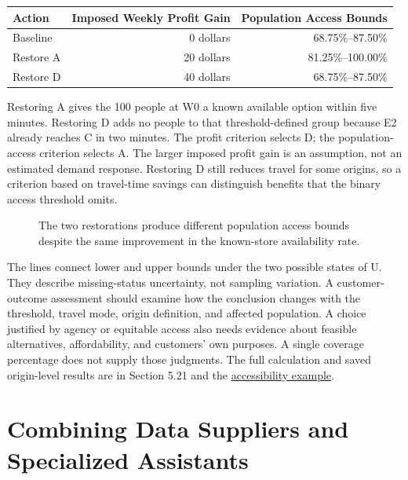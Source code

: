 \begin{table}[H]
\centering\small
\begin{tabular}{@{}lrr@{}}
\toprule
Action & Imposed Weekly Profit Gain & Population Access Bounds \\
\midrule

Baseline & 0 dollars & 68.75\%--87.50\% \\
Restore A & 20 dollars & 81.25\%--100.00\% \\
Restore D & 40 dollars & 68.75\%--87.50\% \\
\bottomrule
\end{tabular}
\end{table}

Restoring A gives the 100 people at W0 a known available option within
five minutes. Restoring D adds no people to that threshold-defined group
because E2 already reaches C in two minutes. The profit criterion
selects D; the population-access criterion selects A. The larger imposed
profit gain is an assumption, not an estimated demand response.
Restoring D still reduces travel for some origins, so a criterion based
on travel-time savings can distinguish benefits that the binary access
threshold omits.

\begin{figure}[htbp]
\centering

\caption{The two restorations produce different population access bounds despite the same improvement in the known-store availability rate.}\label{fig:M08_access_priorities}
\end{figure}

The lines connect lower and upper bounds under the two possible states
of U. They describe missing-status uncertainty, not sampling variation.
A customer-outcome assessment should examine how the conclusion changes
with the threshold, travel mode, origin definition, and affected
population. A choice justified by agency or equitable access also needs
evidence about feasible alternatives, affordability, and customers' own
purposes. A single coverage percentage does not supply those judgments.
The full calculation and saved origin-level results are in Section 5.21
and the
\href{../03_Data_and_Code/Retail_Accessibility/README.md}{accessibility
example}.

\hypertarget{M08-combining-data-suppliers-and-specialized-assistants}{%
\section{Combining Data Suppliers and Specialized
Assistants}\label{M08-combining-data-suppliers-and-specialized-assistants}}

